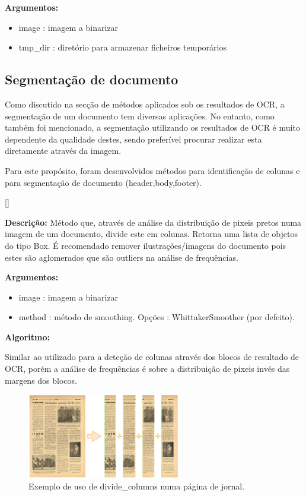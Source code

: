 \textbf{Argumentos:}
\begin{itemize}\setlength\itemsep{-0.3em}
	\item image : imagem a binarizar
	\item tmp\_dir : diretório para armazenar ficheiros temporários
\end{itemize}


\subsection{Segmentação de documento}
\label{contribution_image_segmentation}

Como discutido na secção de métodos aplicados sob os resultados de OCR, a segmentação de um documento tem diversas aplicações. No entanto, como também foi mencionado, a segmentação utilizando os resultados de OCR é muito dependente da qualidade destes, sendo preferível procurar realizar esta diretamente através da imagem.

Para este propósito, foram desenvolvidos métodos para identificação de colunas e para segmentação de documento (header,body,footer).

[\normalsize]

\textbf{Descrição:} Método que, através de análise da distribuição de pixeis pretos numa imagem de um documento, divide este em colunas. Retorna uma lista de objetos do tipo Box.
É recomendado remover ilustrações/imagens do documento pois estes são aglomerados que são outliers na análise de frequências.

\textbf{Argumentos:}
\begin{itemize}\setlength\itemsep{-0.3em}
	\item image : imagem a binarizar
	\item method : método de smoothing. Opções : WhittakerSmoother (por defeito).
\end{itemize}

\textbf{Algoritmo:} 

Similar ao utilizado para a deteção de colunas através dos blocos de resultado de OCR, porém a análise de frequências é sobre a distribuição de pixeis invés das margens dos blocos.


\begin{figure}[H]
	\centering
	\includegraphics[width=0.6\textwidth]{images/ilustracoes/divide_columns_example.png}
	\caption{Exemplo de uso de divide\_columns numa página de jornal.}
	\label{fig:divide_columns_example}
\end{figure}


